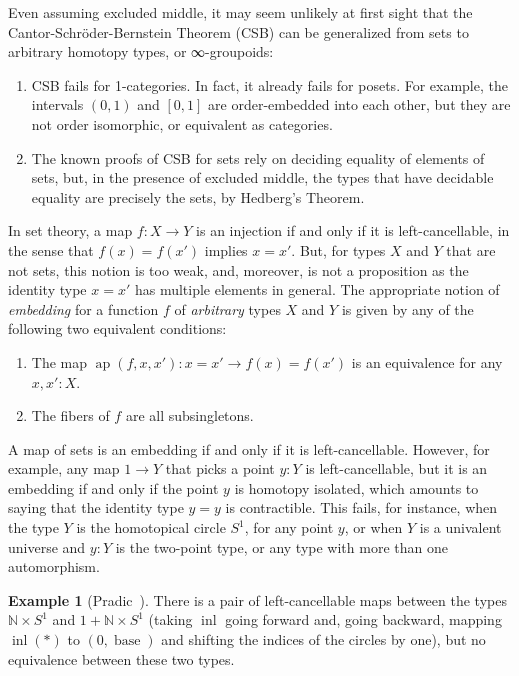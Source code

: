 \documentclass{article}
\theoremstyle{definition}
\newtheorem{example}[theorem]{Example}
\begin{document}
Even assuming excluded middle, it may seem unlikely at first sight
that the Cantor-Schr\"oder-Bernstein Theorem (CSB) can be generalized from sets
to arbitrary homotopy types, or ∞-groupoids:
\begin{enumerate}
 	\item CSB fails for 1-categories.
In fact, it already fails for posets. For example, the intervals $(0,1)$ and $[0,1]$ are order-embedded into each other, but they are not order isomorphic, or equivalent as categories.
 	\item The known proofs of CSB for sets rely on deciding equality of elements of sets, but, in the presence of excluded middle, the types that have decidable equality are precisely the sets, by Hedberg's Theorem.
\end{enumerate}
In set theory, a map $f : X \to Y$ is an injection if and only if it is left-cancellable, in the sense that $f(x)=f(x')$ implies $x=x'$. But, for types $X$ and $Y$ that are not sets, this notion is too weak, and, moreover, is not a proposition as the identity type $x = x'$ has multiple elements in general. The appropriate notion of \emph{embedding} for a function $f$ of \emph{arbitrary} types $X$ and $Y$ is given by any of the following two equivalent conditions:
\begin{enumerate}
 	\item The map $\operatorname{ap}(f,x,x') : x = x' \to f(x) = f(x')$ is an equivalence for any $x,x':X$.
 	\item The fibers of $f$ are all subsingletons.
\end{enumerate}

A map of sets is an embedding if and only if it is left-cancellable. However, for example, any map $1 \to Y$ that picks a point $y:Y$ is left-cancellable, but it is an embedding if and only if the point $y$ is homotopy isolated, which amounts to saying that the identity type $y = y$ is contractible. This fails, for instance, when the type $Y$ is the homotopical circle $S^1$, for any point $y$, or when $Y$ is a univalent universe and $y:Y$ is the two-point type, or any type with more than one automorphism.

\begin{example}[Pradic~\cite{pradic:example}]
  There is a pair of left-cancellable maps between the types
  $\mathbb{N} \times S^1$ and $1 + \mathbb{N} \times S^1$ (taking
  $\operatorname{inl}$ going forward and, going backward, mapping
  $\operatorname{inl}(*)$ to $(0, \operatorname{base})$ and shifting
  the indices of the circles by one), but no equivalence between these
  two types.
\end{example}
\end{document}
